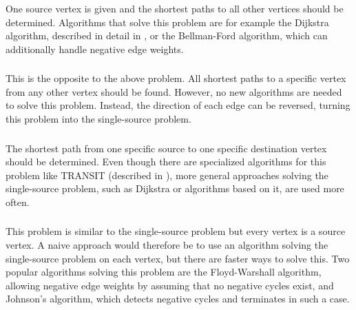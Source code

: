 			One source vertex is given and the shortest paths to all other vertices should be determined.
			Algorithms that solve this problem are for example the Dijkstra algorithm, described in detail in , or the Bellman-Ford algorithm, which can additionally handle negative edge weights\cite[651]{cormen-introduction-to-alg}.
		
		\subsubsection{}
		
			This is the opposite to the above problem.
			All shortest paths to a specific vertex from any other vertex should be found.
			However, no new algorithms are needed to solve this problem.
			Instead, the direction of each edge can be reversed, turning this problem into the single-source problem.
		
		\subsubsection{}
		
			The shortest path from one specific source to one specific destination vertex should be determined.
			Even though there are specialized algorithms for this problem like TRANSIT (described in ), more general approaches solving the single-source problem, such as Dijkstra or algorithms based on it, are used more often.
		
		\subsubsection{}
		\label{subsubsec:all-pair-shortest-path}
		
			This problem is similar to the single-source problem but every vertex is a source vertex.
			A naive approach would therefore be to use an algorithm solving the single-source problem on each vertex, but there are faster ways to solve this.
			Two popular algorithms solving this problem are the Floyd-Warshall algorithm, allowing negative edge weights by assuming that no negative cycles exist\cite[693]{cormen-introduction-to-alg}, and Johnson's algorithm, which detects negative cycles and terminates in such a case\cite[700]{cormen-introduction-to-alg}.
		
